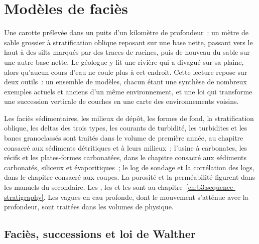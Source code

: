 \chapter{Modèles de faciès}\label{ch:b3:facies-models}

Une carotte prélevée dans un puits d'un kilomètre de profondeur~: un mètre de sable grossier
à stratification oblique reposant sur une base nette, passant vers le haut à des silts
marqués par des traces de racines, puis de nouveau du sable sur une autre base nette. Le
géologue y lit une rivière qui a divagué sur sa plaine, alors qu'aucun cours d'eau ne coule
plus à cet endroit. Cette lecture repose sur deux outils~: un ensemble de modèles, chacun
étant une synthèse de nombreux exemples actuels et anciens d'un même environnement, et une loi
qui transforme une succession verticale de couches en une carte des environnements voisins.

\begin{recall}
Les faciès sédimentaires, les milieux de dépôt, les formes de fond, la stratification oblique,
les deltas des trois types, les courants de turbidité, les turbidites et les bancs granoclassés
sont traités dans le volume de première année, au chapitre consacré aux sédiments détritiques
et à leurs milieux~; l'usine à carbonates, les récifs et les plates-formes carbonatées, dans le
chapitre consacré aux sédiments carbonatés, siliceux et évaporitiques~; le log de sondage
et la corrélation des logs, dans le chapitre consacré aux coupes. La porosité et la perméabilité
figurent dans les manuels du secondaire. Les , les  et les
 sont au chapitre~\ref{ch:b3:sequence-stratigraphy}. Les vagues en eau
profonde, dont le mouvement s'atténue avec la profondeur, sont traitées dans les volumes de physique.
\end{recall}

\section{Faciès, successions et loi de Walther}\label{sec:b3:facies-models:walther}

